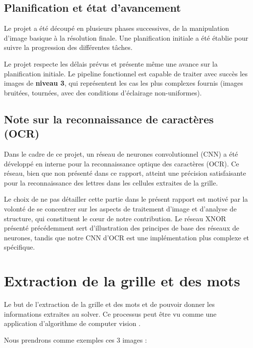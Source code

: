 \documentclass{article}
\begin{document}
\subsection{Planification et état d'avancement}
Le projet a été découpé en plusieurs phases successives, de la manipulation d'image basique à la résolution finale. Une planification initiale a été établie pour suivre la progression des différentes tâches.

Le projet respecte les délais prévus et présente même une avance sur la planification initiale. Le pipeline fonctionnel est capable de traiter avec succès les images de \textbf{niveau 3}, qui représentent les cas les plus complexes fournis (images bruitées, tournées, avec des conditions d'éclairage non-uniformes).
\subsection{Note sur la reconnaissance de caractères (OCR)}
Dans le cadre de ce projet, un réseau de neurones convolutionnel (CNN) a été développé en interne pour la reconnaissance optique des caractères (OCR). Ce réseau, bien que non présenté dans ce rapport, atteint une précision satisfaisante pour la reconnaissance des lettres dans les cellules extraites de la grille.

Le choix de ne pas détailler cette partie dans le présent rapport est motivé par la volonté de se concentrer sur les aspects de traitement d'image et d'analyse de structure, qui constituent le cœur de notre contribution. Le réseau XNOR présenté précédemment sert d'illustration des principes de base des réseaux de neurones, tandis que notre CNN d'OCR est une implémentation plus complexe et spécifique.

\newpage
\section{Extraction de la grille et des mots}
Le but de l'extraction de la grille et des mots et de pouvoir donner les informations extraites au solver. Ce processus peut être vu comme une application d'algorithme de computer vision \cite{szeliski2010computer}.

Nous prendrons comme exemples ces 3 images :
\end{document}

